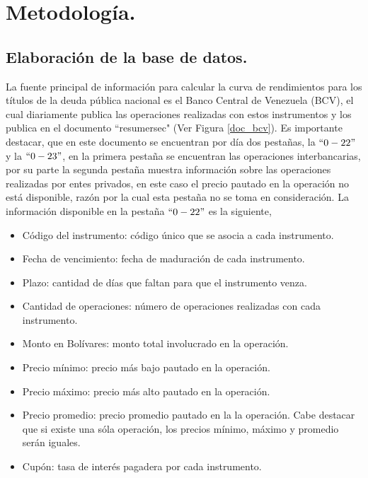 \chapter{Metodolog\'ia.}

\section{Elaboraci\'on de la base de datos.}


\hspace{0.4cm} La fuente principal de informaci\'on para calcular la curva de rendimientos para los t\'itulos de la deuda p\'ublica nacional es el Banco Central de Venezuela (BCV), el cual diariamente publica las operaciones realizadas con estos instrumentos y los publica en el documento ``resumersec"\hspace{0.01cm}  (Ver Figura \ref{doc_bcv}). Es importante destacar, que en este documento se encuentran por d\'ia dos pesta\~nas, la $``0-22"$ y la $``0-23"$, en la primera pesta\~na se encuentran las operaciones interbancarias, por su parte la segunda pesta\~na muestra informaci\'on sobre las operaciones realizadas por entes privados, en este caso el precio pautado en la operaci\'on no est\'a disponible, raz\'on por la cual esta pesta\~na no se toma en consideraci\'on. La informaci\'on disponible en la pesta\~na $``0-22"$ es la siguiente,

\begin{itemize}
  \item C\'odigo del instrumento: c\'odigo \'unico que se asocia a cada instrumento.
  \item Fecha de vencimiento: fecha de maduraci\'on de cada instrumento.
  \item Plazo: cantidad de d\'ias que faltan para que el instrumento venza.
  \item Cantidad de operaciones: n\'umero de operaciones realizadas con cada instrumento.
  \item Monto en Bol\'ivares: monto total involucrado en la operaci\'on.
  \item Precio m\'inimo: precio m\'as bajo pautado en la operaci\'on.
  \item Precio m\'aximo: precio m\'as alto pautado en la operaci\'on.
  \item Precio promedio: precio promedio pautado en la la operaci\'on. Cabe destacar que si existe una s\'ola operaci\'on, los precios m\'inimo, m\'aximo y promedio ser\'an iguales.
  \item Cup\'on: tasa de inter\'es pagadera por cada instrumento.
\end{itemize}


